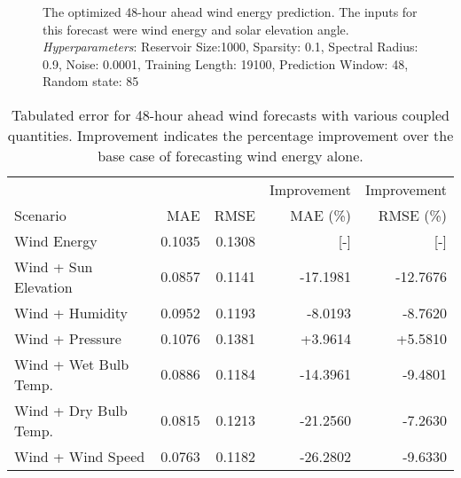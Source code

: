 \begin{figure*}[h]
  \centering
  
  \caption{The optimized 48-hour ahead wind energy prediction. The inputs for this forecast were wind energy and solar elevation angle. \textit{Hyperparameters}: Reservoir Size:1000, Sparsity: 0.1, Spectral Radius: 0.9, Noise: 0.0001, Training Length: 19100, Prediction Window: 48, Random state: 85}
  \label{fig:wind48}
\end{figure*}
  \begin{table*}[h]
    \centering
    \caption{Tabulated error for 48-hour ahead wind forecasts with various coupled quantities. Improvement indicates the percentage improvement over the base case of forecasting wind energy alone.}
    \label{tab:wind48}
    \begin{tabular}{l|r|r|r|r}
      &  & & Improvement & Improvement \\
      Scenario  & MAE & RMSE & MAE (\%) & RMSE (\%)\\
      \hline
      Wind Energy & 0.1035 & 0.1308 & [-] & [-] \\
      Wind + Sun Elevation & 0.0857 & 0.1141 & -17.1981 & -12.7676 \\
      Wind + Humidity & 0.0952 & 0.1193 & -8.0193 & -8.7620 \\
      Wind + Pressure & 0.1076 & 0.1381 & +3.9614 & +5.5810 \\
      Wind + Wet Bulb Temp. & 0.0886 & 0.1184 & -14.3961 & -9.4801 \\
      Wind + Dry Bulb Temp. & 0.0815 & 0.1213 & -21.2560 & -7.2630 \\
      Wind + Wind Speed & 0.0763 & 0.1182 & -26.2802 & -9.6330 \\
    \end{tabular}
  \end{table*}
